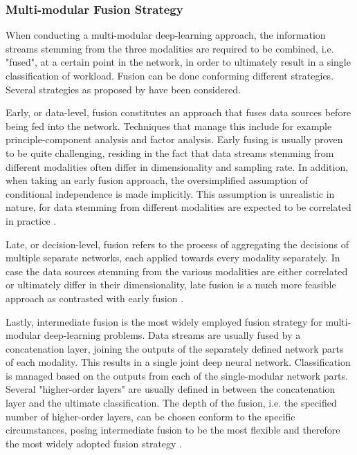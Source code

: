 \documentclass[12pt]{article}
\begin{document}
\subsubsection{Multi-modular Fusion Strategy}  
When conducting a multi-modular deep-learning approach, the information streams stemming from the three modalities are required to be combined, i.e. "fused", at a certain point in the network, in order to ultimately result in a single classification of workload. Fusion can be done conforming different strategies. Several strategies as proposed by  have been considered.

Early, or data-level, fusion constitutes an approach that fuses data sources before being fed into the network. Techniques that manage this include for example principle-component analysis and factor analysis. Early fusing is usually proven to be quite challenging, residing in the fact that data streams stemming from different modalities often differ in dimensionality and sampling rate. In addition, when taking an early fusion approach, the oversimplified assumption of conditional independence is made implicitly. This assumption is unrealistic in nature, for data stemming from different modalities are expected to be correlated in practice \cite{ramachandram2017deep}. 

Late, or decision-level, fusion refers to the process of aggregating the decisions of multiple separate networks, each applied towards every modality separately. In case the data sources stemming from the various modalities are either correlated or ultimately differ in their dimensionality, late fusion is a much more feasible approach as contrasted with early fusion \cite{ramachandram2017deep}.

Lastly, intermediate fusion is the most widely employed fusion strategy for multi-modular deep-learning problems. Data streams are usually fused by a concatenation layer, joining the outputs of the separately defined network parts of each modality. This results in a single joint deep neural network. Classification is managed based on the outputs from each of the single-modular network parts. Several "higher-order layers" are usually defined in between the concatenation layer and the ultimate classification. The depth of the fusion, i.e. the specified number of higher-order layers, can be chosen conform to the specific circumstances, posing intermediate fusion to be the most flexible and therefore the most widely adopted fusion strategy \cite{ramachandram2017deep}.
\end{document}
